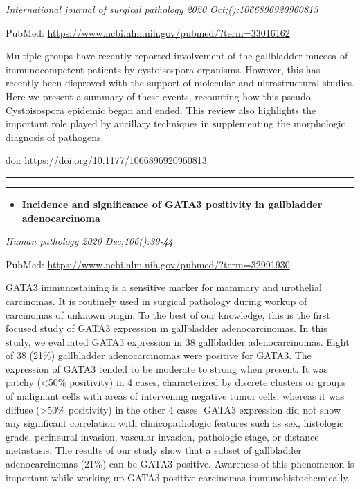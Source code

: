 \documentclass[
]{article}
\providecommand{\tightlist}{%
  \setlength{\itemsep}{0pt}\setlength{\parskip}{0pt}}
\begin{document}
\emph{International journal of surgical pathology 2020
Oct;():1066896920960813}

PubMed: \url{https://www.ncbi.nlm.nih.gov/pubmed/?term=33016162}

Multiple groups have recently reported involvement of the gallbladder
mucosa of immunocompetent patients by cystoisospora organisms. However,
this has recently been disproved with the support of molecular and
ultrastructural studies. Here we present a summary of these events,
recounting how this pseudo-Cystoisospora epidemic began and ended. This
review also highlights the important role played by ancillary techniques
in supplementing the morphologic diagnosis of pathogens.

doi: \url{https://doi.org/10.1177/1066896920960813}

\begin{center}\rule{0.5\linewidth}{0.5pt}\end{center}

\begin{center}\rule{0.5\linewidth}{0.5pt}\end{center}

\begin{itemize}
\tightlist
\item
  \textbf{Incidence and significance of GATA3 positivity in gallbladder
  adenocarcinoma}
\end{itemize}

\emph{Human pathology 2020 Dec;106():39-44}

PubMed: \url{https://www.ncbi.nlm.nih.gov/pubmed/?term=32991930}

GATA3 immunostaining is a sensitive marker for mammary and urothelial
carcinomas. It is routinely used in surgical pathology during workup of
carcinomas of unknown origin. To the best of our knowledge, this is the
first focused study of GATA3 expression in gallbladder adenocarcinomas.
In this study, we evaluated GATA3 expression in 38 gallbladder
adenocarcinomas. Eight of 38 (21\%) gallbladder adenocarcinomas were
positive for GATA3. The expression of GATA3 tended to be moderate to
strong when present. It was patchy (\textless50\% positivity) in 4
cases, characterized by discrete clusters or groups of malignant cells
with areas of intervening negative tumor cells, whereas it was diffuse
(\textgreater50\% positivity) in the other 4 cases. GATA3 expression did
not show any significant correlation with clinicopathologic features
such as sex, histologic grade, perineural invasion, vascular invasion,
pathologic stage, or distance metastasis. The results of our study show
that a subset of gallbladder adenocarcinomas (21\%) can be GATA3
positive. Awareness of this phenomenon is important while working up
GATA3-positive carcinomas immunohistochemically.
\end{document}
